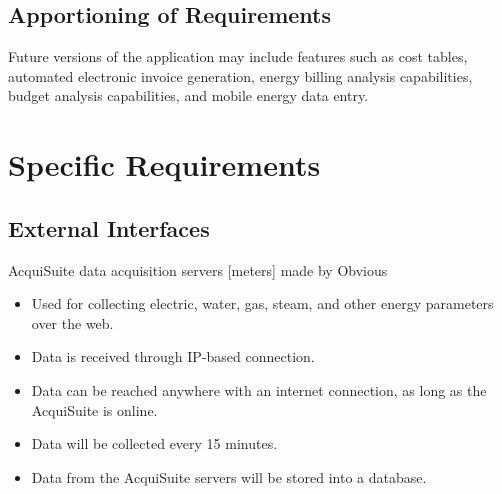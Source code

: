 \documentclass[onecolumn, draftclsnofoot,10pt, compsoc]{IEEEtran}
\begin{document}
    \subsection{Apportioning of Requirements}
    Future versions of the application may include features such as cost tables, automated electronic invoice generation, energy billing analysis capabilities, budget analysis capabilities, and mobile energy data entry.
    
    \section{Specific Requirements}
    
    \subsection{External Interfaces}
    AcquiSuite data acquisition servers [meters] made by Obvious
    \begin{itemize}
        \item Used for collecting electric, water, gas, steam, and other energy parameters over the web.
        \item Data is received through IP-based connection.
        \item Data can be reached anywhere with an internet connection, as long as the AcquiSuite is online.
        \item Data will be collected every 15 minutes.
        \item Data from the AcquiSuite servers will be stored into a database.
    \end{itemize}
\end{document}
